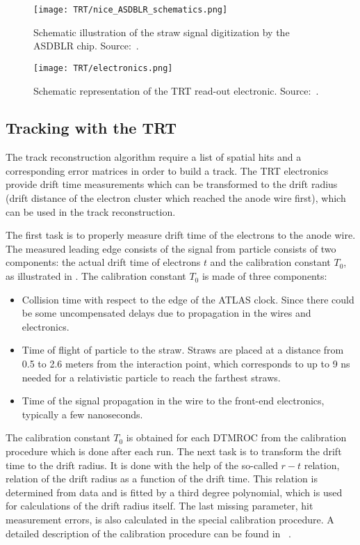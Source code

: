 \begin{figure}
\centering
\texttt{[image: TRT/nice\_ASDBLR\_schematics.png]}
\caption{ 
 Schematic illustration of the straw signal digitization by the ASDBLR chip. Source:~\cite{Aad:2008zzm}.
}
\label{fig:nice_asdblr_schematics}
\end{figure}


\begin{figure}
\centering
\texttt{[image: TRT/electronics.png]}
\caption{ 
 Schematic representation of the TRT read-out electronic. Source:~\cite{TRT_electronics}.
}
\label{fig:electronics}
\end{figure}



\subsection{Tracking with the TRT}
\label{subsec:tracking_with_trt}

The track reconstruction algorithm require a list of spatial hits and a corresponding error matrices in order to build a track. The TRT electronics provide drift time measurements which can be transformed to the
drift radius (drift distance of the electron cluster which reached the anode wire first), which can be used in the track reconstruction.

The first task is to properly measure drift time of the electrons to the anode wire. 
The measured leading edge consists of the signal from particle 
consists of two components: the actual drift time of electrons $t$ and the calibration constant $T_{0}$, as illustrated in .
The calibration constant $T_{0}$ is made of three components:
\begin{itemize}
 \item Collision time with respect to the edge of the ATLAS clock. Since there could be some uncompensated delays due to propagation in the wires and electronics.
 \item Time of flight of particle to the straw. Straws are placed at a distance from 0.5 to 2.6 meters from the interaction point, 
 which corresponds to up to 9 ns needed for a relativistic particle to reach the farthest straws.
 \item Time of the signal propagation in the wire to the front-end electronics, typically a few nanoseconds.
\end{itemize}
The calibration constant $T_{0}$ is obtained for each DTMROC from the calibration procedure which is done after each run.
The next task is to transform the drift time to the drift radius. It is done with the help of the so-called $r-t$ relation, relation of the drift radius as a function of the drift time.
This relation is determined from data and is fitted by a third degree polynomial, which is used for calculations of the drift radius itself.
The last missing parameter, hit measurement errors, is also calculated in the special calibration procedure. A detailed description of the calibration procedure
can be found in ~\cite{alonso_thesis}.

